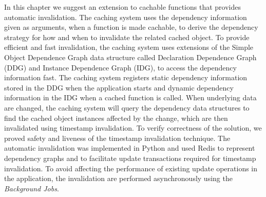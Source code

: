 In this chapter we suggest an extension to cachable functions that provides automatic invalidation. The caching system uses the dependency information given as arguments, when a function is made cachable, to derive the dependency strategy for how and when to invalidate the related cached object. To provide efficient and fast invalidation, the caching system uses extensions of the Simple Object Dependence Graph data structure called Declaration Dependence Graph (DDG) and Instance Dependence Graph (IDG), to access the dependency information fast.
The caching system registers static dependency information stored in the DDG when the application starts and dynamic dependency information in the IDG when a cached function is called.
When underlying data are changed, the caching system will query the dependency data structures to find the cached object instances affected by the change, which are then invalidated using timestamp invalidation. To verify correctness of the solution, we proved safety and liveness of the timestamp invalidation technique.
The automatic invalidation was implemented in Python and used Redis to represent dependency graphs and to facilitate update transactions required for timestamp invalidation. To avoid affecting the performance of existing update operations in the application, the invalidation are performed asynchronously using the \emph{Background Jobs}.



